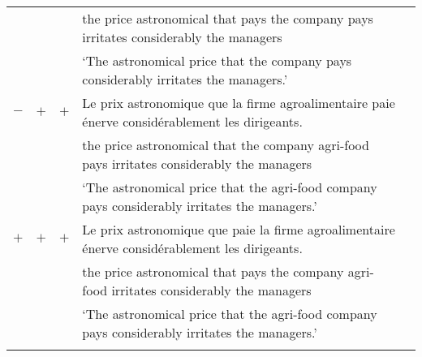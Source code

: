 \documentclass[output=paper]{langscibook}
\begin{document}
\begin{table}[H]
{\begin{tabular}{lllll}
& & & the price astronomical that pays the company pays irritates considerably the managers \\
& & & `The astronomical price that  the company pays considerably irritates the managers.'\\
$-$ & $+$ & $+$  &	Le prix astronomique que la firme agroalimentaire paie énerve considérablement les dirigeants.\\
& & & the price astronomical that the company agri-food  pays irritates considerably the managers \\
& & & `The astronomical price that the agri-food company pays considerably irritates the managers.'\\
 $+$ & $+$ & $+$  &	Le prix astronomique que paie la firme agroalimentaire énerve considérablement les dirigeants.\\
& & & the price astronomical that pays the company agri-food irritates considerably the managers \\
& & & `The astronomical price that  the agri-food company pays considerably irritates the managers.'\\

  \lspbottomrule
 \end{tabular}%
 }
 

\end{table}
\end{document}
